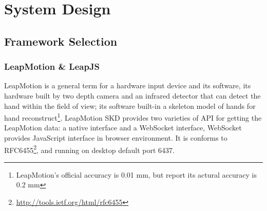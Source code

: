 \chapter{System Design}

\section{Framework Selection}

\subsection{LeapMotion \& LeapJS}

LeapMotion \cite{Leap:2016} is a general term for a hardware input device and its software, its hardware built by two depth camera and an infrared detector that can detect the hand within the field of view; its software built-in a skeleton model of hands for hand reconstruct\footnote{ LeapMotion's official accuracy is 0.01 mm, but \cite{weichert2013analysis, gdu2016} report its actural accuracy is 0.2 mm}.
LeapMotion SKD provides two varieties of API for getting the LeapMotion data: a native interface and a WebSocket interface, WebSocket provides JavaScript interface in browser environment. It is conforms to RFC6455\footnote{\url{http://tools.ietf.org/html/rfc6455}}, and running on desktop default port 6437.

